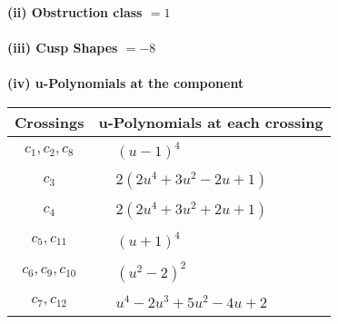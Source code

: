 \documentclass[1p]{elsarticle_modified}
\theoremstyle{definition}
\begin{document}
\flushleft \textbf{(ii) Obstruction class $= 1$}\\~\\
\flushleft \textbf{(iii) Cusp Shapes $= -8$}\\~\\
\newpage\renewcommand{\arraystretch}{1}
\flushleft \textbf{(iv) u-Polynomials at the component}\newline \\
\begin{tabular}{m{50pt}|m{274pt}}
Crossings & \hspace{64pt}u-Polynomials at each crossing \\
\hline $$\begin{aligned}c_{1},c_{2},c_{8}\end{aligned}$$&$\begin{aligned}
&(u-1)^4
\end{aligned}$\\
\hline $$\begin{aligned}c_{3}\end{aligned}$$&$\begin{aligned}
&2(2 u^4+3 u^2-2 u+1)
\end{aligned}$\\
\hline $$\begin{aligned}c_{4}\end{aligned}$$&$\begin{aligned}
&2(2 u^4+3 u^2+2 u+1)
\end{aligned}$\\
\hline $$\begin{aligned}c_{5},c_{11}\end{aligned}$$&$\begin{aligned}
&(u+1)^4
\end{aligned}$\\
\hline $$\begin{aligned}c_{6},c_{9},c_{10}\end{aligned}$$&$\begin{aligned}
&(u^2-2)^2
\end{aligned}$\\
\hline $$\begin{aligned}c_{7},c_{12}\end{aligned}$$&$\begin{aligned}
&u^4-2 u^3+5 u^2-4 u+2
\end{aligned}$\\
\hline
\end{tabular}\\~\\
\end{document}

